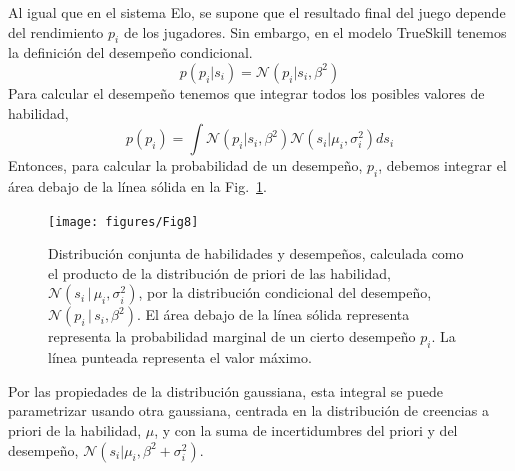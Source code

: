 \documentclass[a4paper,11pt]{book}
\newcommand{\N}{\mathcal{N}}
\theoremstyle{definition}
\begin{document}

Al igual que en el sistema Elo, se supone que el resultado final del juego depende del rendimiento $p_i$ de los jugadores.
%
Sin embargo, en el modelo TrueSkill tenemos la definición del desempeño condicional.
%
\begin{equation}
p(p_i|s_i) = \N(p_i | s_i, \beta^2)
\end{equation}
%
Para calcular el desempeño tenemos que integrar todos los posibles valores de habilidad,
%
\begin{equation}\label{p.p_i}
p(p_i) = \int \N(p_i | s_i, \beta^2) \N(s_i | \mu_i,\sigma_i^2) ds_i
\end{equation}
%
Entonces, para calcular la probabilidad de un desempeño, $p_i$, debemos integrar el área debajo de la línea sólida en la Fig.~\ref{paso_1_multiplicacion_normales}.
%
\begin{figure}[ht!]
\centering
\texttt{[image: figures/Fig8]}
\caption{Distribución conjunta de habilidades y desempeños, calculada como el producto de la distribución de priori de las habilidad, $\N(s_i \, | \, \mu_i, \sigma_i^2)$, por la distribución condicional del desempeño, $\N(p_i \, | \, s_i, \beta^2)$.
%
El área debajo de la línea sólida representa representa la probabilidad marginal de un cierto desempeño $p_i$.
%
La línea punteada representa el valor máximo.
}
\label{paso_1_multiplicacion_normales}
\end{figure}
%
Por las propiedades de la distribución gaussiana, esta integral se puede parametrizar usando otra gaussiana, centrada en la distribución de creencias a priori de la habilidad, $\mu$, y con la suma de incertidumbres del priori y del desempeño, $\N(s_i | \mu_i, \beta^2 +\sigma_i^2)$.

\end{document}

